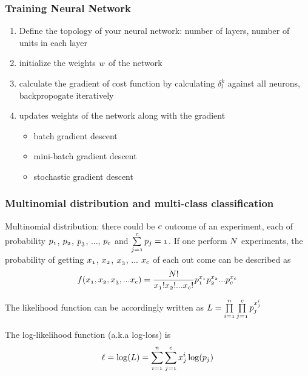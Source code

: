 \documentclass[notheorems, aspectratio=54]{beamer}
\begin{document}
\begin{frame}
\frametitle{Training Neural Network}
\begin{enumerate}
\item Define the topology of your neural network: number of layers, number of units in each layer
\item initialize the weights $\mathnormal{w}$ of the network
\item calculate the gradient of cost function by calculating $\delta^k_l$ against all neurons, backpropogate iteratively 
\item updates weights of the network along with the gradient
\begin{itemize}
\item batch gradient descent
\item mini-batch gradient descent
\item stochastic gradient descent
\end{itemize}
\end{enumerate}
\end{frame}



\begin{frame}
\frametitle{Multinomial distribution and multi-class classification}

Multinomial distribution: there could be $\mathnormal{c}$ outcome of an experiment, each of probability  $\mathnormal{p_1}$, $\mathnormal{p_2}$, $\mathnormal{p_3}$, ..., $\mathnormal{p_c}$ and $\mathnormal{\sum\limits_{j=1}^c p_j=1}$. If one perform $\mathnormal{N}$ experiments, the probability of getting $\mathnormal{x_1}$, $\mathnormal{x_2}$, $\mathnormal{x_3}$, ... $\mathnormal{x_c}$ of each out come can be described as 
$$\mathnormal{f(x_1, x_2, x_3, ... x_c)=\frac{N!}{x_1! x_2! ... x_c!} p_1^{x_1} p_2^{x_2} ... p_c^{x_c}}$$

The likelihood function can be accordingly written as 
$\mathnormal{L= \prod \limits_{i=1}^n\prod \limits_{j=1}^c p_{j}^{x^i_j}}$

The log-likelihood function (a.k.a log-loss) is
$$\mathnormal{\ell=\log(L)=\sum\limits_{i=1}^n \sum\limits_{j=1}^c x_j^i \log(p_j)}$$
\end{frame}
\end{document}
